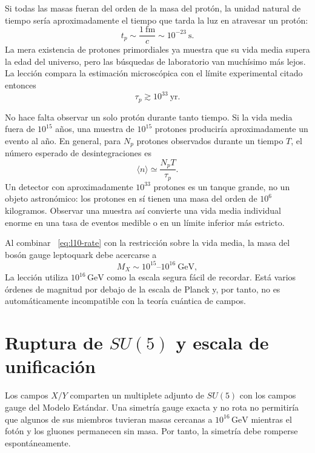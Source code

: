 Si todas las masas fueran del orden de la masa del protón, la unidad natural de tiempo sería aproximadamente el tiempo que tarda la luz en atravesar un protón:
\begin{equation}
t_p\sim\frac{1\ \mathrm{fm}}{c}\sim10^{-23}\ \mathrm{s}.
\label{eq:l10-proton-time}
\end{equation}
La mera existencia de protones primordiales ya muestra que su vida media supera la edad del universo, pero las búsquedas de laboratorio van muchísimo más lejos. La lección compara la estimación microscópica con el límite experimental citado entonces
\begin{equation}
\tau_p\gtrsim10^{33}\ \mathrm{yr}.
\label{eq:l10-lifetime-bound}
\end{equation}

No hace falta observar un solo protón durante tanto tiempo. Si la vida media fuera de \(10^{15}\) años, una muestra de \(10^{15}\) protones produciría aproximadamente un evento al año. En general, para \(N_p\) protones observados durante un tiempo \(T\), el número esperado de desintegraciones es
\begin{equation}
\langle n\rangle\simeq\frac{N_pT}{\tau_p}.
\label{eq:l10-event-count}
\end{equation}
Un detector con aproximadamente \(10^{33}\) protones es un tanque grande, no un objeto astronómico: los protones en sí tienen una masa del orden de \(10^6\) kilogramos. Observar una muestra así convierte una vida media individual enorme en una tasa de eventos medible o en un límite inferior más estricto.

Al combinar ~\eqref{eq:l10-rate} con la restricción sobre la vida media, la masa del bosón gauge leptoquark debe acercarse a
\begin{equation}
M_X\sim10^{15}\text{--}10^{16}\ \mathrm{GeV},
\label{eq:l10-mx}
\end{equation}
La lección utiliza \(10^{16}\,\mathrm{GeV}\) como la escala segura fácil de recordar. Está varios órdenes de magnitud por debajo de la escala de Planck y, por tanto, no es automáticamente incompatible con la teoría cuántica de campos.

\section{Ruptura de \texorpdfstring{\(SU(5)\)}{SU(5)} y escala de unificación}

Los campos \(X/Y\) comparten un multiplete adjunto de \(SU(5)\) con los campos gauge del Modelo Estándar. Una simetría gauge exacta y no rota no permitiría que algunos de sus miembros tuvieran masas cercanas a \(10^{16}\,\mathrm{GeV}\) mientras el fotón y los gluones permanecen sin masa. Por tanto, la simetría debe romperse espontáneamente.

